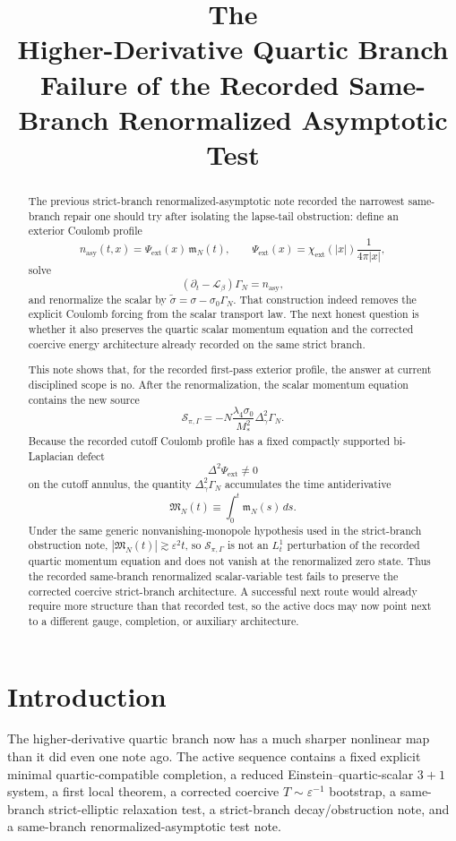 \documentclass[11pt]{article}
\title{\textbf{The \TheoryName{}}\\[0.4em]
\large Higher-Derivative Quartic Branch Failure of the Recorded Same-Branch Renormalized Asymptotic Test}
\author{}
\date{}
\newcommand{\Ell}{\mathcal{L}}
\begin{document}
\maketitle

\begin{abstract}
The previous strict-branch renormalized-asymptotic note recorded the narrowest same-branch repair one should try after isolating the lapse-tail obstruction: define an exterior Coulomb profile
\[
n_{\mathrm{asy}}(t,x)=\Psi_{\mathrm{ext}}(x)\,\mathfrak m_N(t),
\qquad
\Psi_{\mathrm{ext}}(x)=\chi_{\mathrm{ext}}(|x|)\frac{1}{4\pi|x|},
\]
solve
\[
(\partial_t-\Ell_\beta)\Gamma_N=n_{\mathrm{asy}},
\]
and renormalize the scalar by \(\widetilde{\sigma}=\sigma-\sigma_0\Gamma_N\). That construction indeed removes the explicit Coulomb forcing from the scalar transport law. The next honest question is whether it also preserves the quartic scalar momentum equation and the corrected coercive energy architecture already recorded on the same strict branch.

This note shows that, for the recorded first-pass exterior profile, the answer at current disciplined scope is no. After the renormalization, the scalar momentum equation contains the new source
\[
\mathcal S_{\pi,\Gamma}
=
-N\frac{\lambda_4\sigma_0}{M_*^2}\Delta_\gamma^2\Gamma_N.
\]
Because the recorded cutoff Coulomb profile has a fixed compactly supported bi-Laplacian defect
\[
\Delta^2\Psi_{\mathrm{ext}}\neq 0
\]
on the cutoff annulus, the quantity \(\Delta_\gamma^2\Gamma_N\) accumulates the time antiderivative
\[
\mathfrak M_N(t)\equiv \int_0^t \mathfrak m_N(s)\,ds.
\]
Under the same generic nonvanishing-monopole hypothesis used in the strict-branch obstruction note, \(|\mathfrak M_N(t)|\gtrsim \varepsilon^2 t\), so \(\mathcal S_{\pi,\Gamma}\) is not an \(L_t^1\) perturbation of the recorded quartic momentum equation and does not vanish at the renormalized zero state. Thus the recorded same-branch renormalized scalar-variable test fails to preserve the corrected coercive strict-branch architecture. A successful next route would already require more structure than that recorded test, so the active docs may now point next to a different gauge, completion, or auxiliary architecture.
\end{abstract}

\section{Introduction}

The higher-derivative quartic branch now has a much sharper nonlinear map than it did even one note ago. The active sequence contains a fixed explicit minimal quartic-compatible completion, a reduced Einstein--quartic-scalar \(3+1\) system, a first local theorem, a corrected coercive \(T\sim\varepsilon^{-1}\) bootstrap, a same-branch strict-elliptic relaxation test, a strict-branch decay/obstruction note, and a same-branch renormalized-asymptotic test note.
\end{document}
